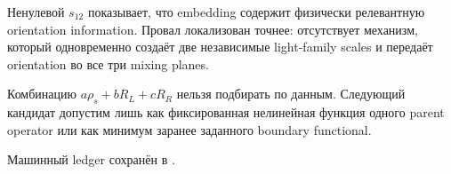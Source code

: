 \begin{remark}
Ненулевой \(s_{12}\) показывает, что embedding содержит физически релевантную
orientation information. Провал локализован точнее: отсутствует механизм,
который одновременно создаёт две независимые light-family scales и передаёт
orientation во все три mixing planes.
\end{remark}

\begin{nogocriterion}
Комбинацию \(a\rho_s+bR_L+cR_R\) нельзя подбирать по данным. Следующий
кандидат допустим лишь как фиксированная нелинейная функция одного parent
operator или как минимум заранее заданного boundary functional.
\end{nogocriterion}

Машинный ledger сохранён в
.